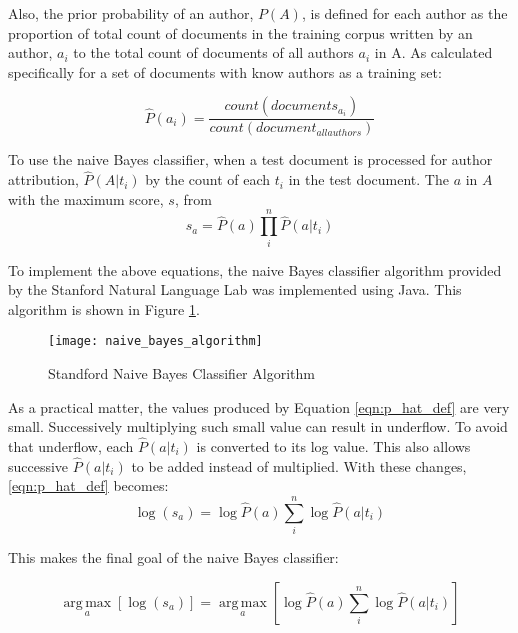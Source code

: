 		Also, the prior probability of an author, $P(A)$, is defined for each author as the proportion of total count of documents in the training corpus written by an author, $a_i$ to the total count of documents of all authors $a_i$ in A. As calculated specifically for a set of documents with know authors as a training set:
		
		\begin{equation} \hat{P}(a_i) = \frac{count(documents_{a_i})}{count(document_{all authors})} \end{equation}		
		
		To use the naive Bayes classifier, when a test document is processed for author attribution, $\hat{P}(A|t_i)$ by the count of each $t_i$ in the test document.  The $a$ in $A$ with the maximum score, $s$, from 
		\begin{equation} \label{eqn:p_hat_def}s_a = \hat{P}(a) \prod_i^n \hat{P}(a|t_i) \end{equation}
		
		To implement the above equations, the naive Bayes classifier algorithm provided by the Stanford Natural Language Lab \cite{_naive_????} was implemented using Java.  This algorithm is shown in Figure \ref{fig:naive_bayes_algorithm}.
		\begin{figure}[htbp!]
			\begin{center}
			\centering
			\texttt{[image: naive\_bayes\_algorithm]}
			\caption{Standford Naive Bayes Classifier Algorithm}
			\label{fig:naive_bayes_algorithm}
			\end{center}
		\end{figure}
		
		As a practical matter, the values produced by Equation \ref{eqn:p_hat_def} are very small.  Successively multiplying such small value can result in underflow.  To avoid that underflow, each $\hat{P}(a|t_i)$ is converted to its log value.  This also allows successive $\hat{P}(a|t_i)$ to be added instead of multiplied.  With these changes, \ref{eqn:p_hat_def} becomes:
		\begin{equation} \log(s_a) = \log{\hat{P}(a)} \sum_i^n \log{\hat{P}(a|t_i)} \end{equation}
		
		This makes the final goal of the naive Bayes classifier:
		
		\begin{equation} \operatorname*{arg\,max}_a [ \log(s_a)] = \operatorname*{arg\,max}_a [ \log{\hat{P}(a)} \sum_i^n \log{\hat{P}(a|t_i)} ] \end{equation}

